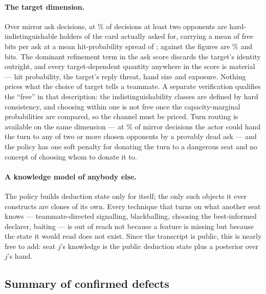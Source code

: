 \paragraph{The target dimension.} Over \numAskDecisions{} mirror ask decisions,
at \numTargetTwo\% of decisions at least two opponents are hard-indistinguishable
holders of the card actually asked for, carrying a mean of \numTargetBits{} free
bits per ask at a mean hit-probability spread of \numTargetSpread{}; against
\vthree{} the figures are \numTargetTwoVthree\% and \numTargetBitsVthree{} bits.
The dominant refinement term in the ask score discards the target's identity
outright, and every target-dependent quantity anywhere in the score is material
--- hit probability, the target's reply threat, hand size and exposure. Nothing
prices what the choice of target tells a teammate. A separate verification
qualifies the ``free'' in that description: the indistinguishability classes are
defined by hard consistency, and choosing within one is not free once the
capacity-marginal probabilities are compared, so the channel must be priced.
Turn routing is available on the same dimension --- at \numRouteTwo\% of mirror
decisions the actor could hand the turn to any of two or more chosen opponents by
a provably dead ask --- and the policy has one soft penalty for donating the turn
to a dangerous seat and no concept of choosing whom to donate it to.

\paragraph{A knowledge model of anybody else.} The policy builds deduction state
only for itself; the only such objects it ever constructs are clones of its own.
Every technique that turns on what another seat knows --- teammate-directed
signalling, blackballing, choosing the best-informed declarer, baiting --- is out
of reach not because a feature is missing but because the state it would read
does not exist. Since the transcript is public, this is nearly free to add:
seat $j$'s knowledge is the public deduction state plus a posterior over $j$'s
hand.

\subsection{Summary of confirmed defects}
\label{sec:diag-summary}

